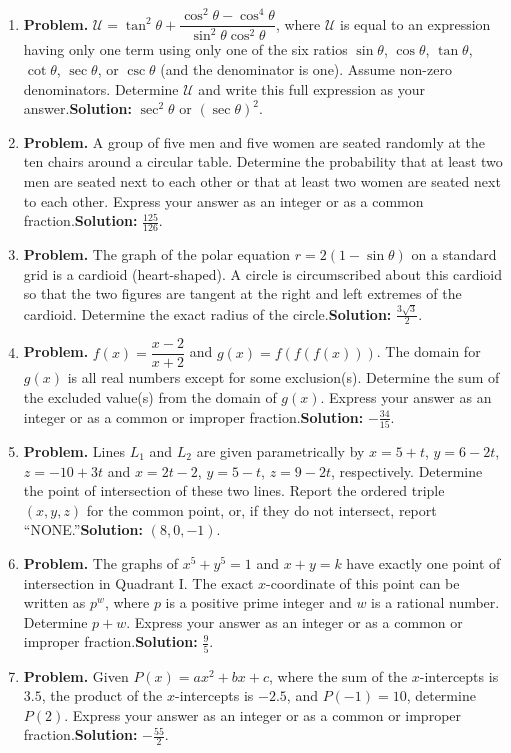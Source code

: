 \documentclass[10pt]{article}
\begin{document}
\begin{enumerate}
  \item \textbf{Problem.} $\mathcal U=\tan^2\theta+\dfrac{\cos^2\theta-\cos^4\theta}{\sin^2\theta\cos^2\theta}$, where $\mathcal U$ is equal to an expression having only one term using only one of the six ratios $\sin\theta$, $\cos\theta$, $\tan\theta$, $\cot\theta$, $\sec\theta$, or $\csc\theta$ (and the denominator is one). Assume non-zero denominators. Determine $\mathcal U$ and write this full expression as your answer.\quad \textbf{Solution:} $\sec^2\theta$ or $(\sec\theta)^2$.
  \item \textbf{Problem.} A group of five men and five women are seated randomly at the ten chairs around a circular table. Determine the probability that at least two men are seated next to each other or that at least two women are seated next to each other. Express your answer as an integer or as a common fraction.\quad \textbf{Solution:} $\frac{125}{126}$.
  \item \textbf{Problem.} The graph of the polar equation $r=2(1-\sin\theta)$ on a standard grid is a cardioid (heart-shaped). A circle is circumscribed about this cardioid so that the two figures are tangent at the right and left extremes of the cardioid. Determine the exact radius of the circle.\quad \textbf{Solution:} $\frac{3\sqrt3}{2}$.
  \item \textbf{Problem.} $f(x)=\dfrac{x-2}{x+2}$ and $g(x)=f(f(f(x)))$. The domain for $g(x)$ is all real numbers except for some exclusion(s). Determine the sum of the excluded value(s) from the domain of $g(x)$. Express your answer as an integer or as a common or improper fraction.\quad \textbf{Solution:} $-\frac{34}{15}$.
  \item \textbf{Problem.} Lines $L_1$ and $L_2$ are given parametrically by $x=5+t$, $y=6-2t$, $z=-10+3t$ and $x=2t-2$, $y=5-t$, $z=9-2t$, respectively. Determine the point of intersection of these two lines. Report the ordered triple $(x,y,z)$ for the common point, or, if they do not intersect, report ``NONE.''\quad \textbf{Solution:} $(8,0,-1)$.
  \item \textbf{Problem.} The graphs of $x^5+y^5=1$ and $x+y=k$ have exactly one point of intersection in Quadrant I. The exact $x$-coordinate of this point can be written as $p^w$, where $p$ is a positive prime integer and $w$ is a rational number. Determine $p+w$. Express your answer as an integer or as a common or improper fraction.\quad \textbf{Solution:} $\frac95$.
  \item \textbf{Problem.} Given $P(x)=ax^2+bx+c$, where the sum of the $x$-intercepts is $3.5$, the product of the $x$-intercepts is $-2.5$, and $P(-1)=10$, determine $P(2)$. Express your answer as an integer or as a common or improper fraction.\quad \textbf{Solution:} $-\frac{55}{2}$.

\end{enumerate}
\end{document}
